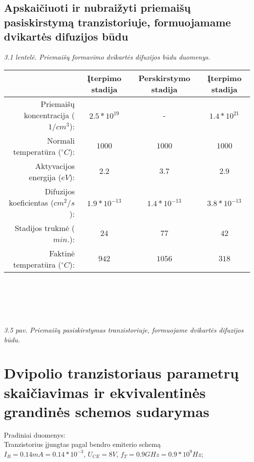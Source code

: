 \documentclass[11pt,a4paper]{article}
\begin{document}
\subsection{Apskaičiuoti ir nubraižyti priemaišų pasiskirstymą tranzistoriuje, formuojamame dvikartės difuzijos būdu}

\textsl{3.1 lentelė. Priemaišų formavimo dvikartės difuzijos būdu duomenys.}\\
\begin{tabular}{|r|c|c|c|}\hline
  & Įterpimo stadija & Perskirstymo stadija & Įterpimo stadija \\ \hline
  Priemaišų koncentracija ($1/cm^3$): & $2.5*10^{19}$   & -              & $1.4*10^{21}$ \\ \hline
  Normali temperatūra ($^{\circ}C$):   & $1000$         & $1000$         & $1000$ \\ \hline
  Aktyvacijos energija ($eV$):        & $2.2$          & $3.7$          & $2.9$ \\ \hline
  Difuzijos koeficientas ($cm^2/s$):  & $1.9*10^{-13}$  & $1.4*10^{-13}$  & $3.8*10^{-13}$ \\  \hline
  Stadijos trukmė ($min.$):           & $24$           & $77$           & $42$ \\ \hline
  Faktinė temperatūra ($^{\circ}C$):   & $942$          & $1056$         & $318$ \\ \hline
\end{tabular}\\\\\\
\\

\textsl{3.5 pav. Priemaišų pasiskirstymas tranzistoriuje, formuojame dvikartės difuzijos būdu.}

\section{Dvipolio tranzistoriaus parametrų skaičiavimas ir ekvivalentinės grandinės schemos sudarymas}
Pradiniai duomenys:\\
Tranzistorius įjungtas pagal bendro emiterio schemą\\
$I_B = 0.14 mA = 0.14 * 10^{-3}$, $U_{CE} = 8V$, $f_{T} = 0.9 GHz = 0.9*10^{9}Hz$;\\
\end{document}
